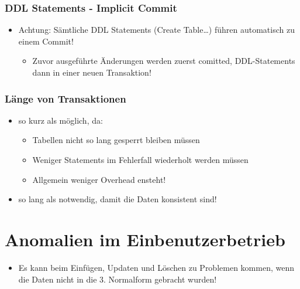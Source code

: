 \subsubsection{DDL Statements - Implicit Commit}
\begin{itemize}
    \item Achtung: Sämtliche DDL Statements (Create Table\dots) führen automatisch zu einem Commit!
    \begin{itemize}
        \item Zuvor ausgeführte Änderungen werden zuerst comitted, DDL-Statements dann in einer neuen Transaktion!
    \end{itemize}
\end{itemize}
\subsubsection{Länge von Transaktionen}
\begin{itemize}
    \item so kurz als möglich, da:
    \begin{itemize}
        \item Tabellen nicht so lang gesperrt bleiben müssen
        \item Weniger Statements im Fehlerfall wiederholt werden müssen
        \item Allgemein weniger Overhead ensteht!
    \end{itemize}
    \item so lang als notwendig, damit die Daten konsistent sind!
\end{itemize}

\section{Anomalien im Einbenutzerbetrieb}
\begin{itemize}
    \item Es kann beim Einfügen, Updaten und Löschen zu Problemen kommen, wenn die Daten nicht in die 3. Normalform gebracht wurden!
\end{itemize}